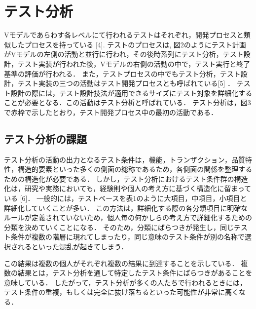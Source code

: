 \documentclass[a4paper,12pt]{jreport}
\begin{document}
\section{テスト分析}
Vモデルであらわす各レベルにて行われるテストはそれぞれ，開発プロセスと類似したプロセスを持っている [4].
テストのプロセスは, 図2のようにテスト計画がVモデルの左側の活動と並行に行われ，その後時系列にテスト分析，テスト設計，テスト実装が行われた後，Vモデルの右側の活動の中で，テスト実行と終了基準の評価が行われる．
また，テストプロセスの中でもテスト分析，テスト設計，テスト実装の三つの活動はテスト開発プロセスとも呼ばれている[5] ．
テスト設計の際には，テスト設計技法が適用できるサイズにテスト対象を詳細化することが必要となる．この活動はテスト分析と呼ばれている．
テスト分析は，図3で赤枠で示したとおり，テスト開発プロセス中の最初の活動である．
\subsection{テスト分析の課題}
テスト分析の活動の出力となるテスト条件は，機能，トランザクション，品質特性，構造的要素といった多くの側面の総称であるため，各側面の関係を整理するための構造化が必要である．
しかし，テスト分析におけるテスト条件群の構造化は，研究や実務においても，経験則や個人の考え方に基づく構造化に留まっている [6]．
一般的には，テストベースを表1のように大項目，中項目，小項目と詳細化していくことが多い．
この方法は，詳細化する際の各分類項目に明確なルールが定義されていないため，個人毎の何かしらの考え方で詳細化するための分類を決めていくことになる．
そのため，分類にばらつきが発生し，同じテスト条件が複数の階層に現れてしまったり，同じ意味のテスト条件が別の名称で選択されるといった混乱が起きてしまう．

この結果は複数の個人がそれぞれ複数の結果に到達することを示している．
複数の結果とは，テスト分析を通して特定したテスト条件にばらつきがあることを意味している．
したがって，テスト分析が多くの人たちで行われるときには，テスト条件の重複，もしくは完全に抜け落ちるといった可能性が非常に高くなる．
\end{document}
